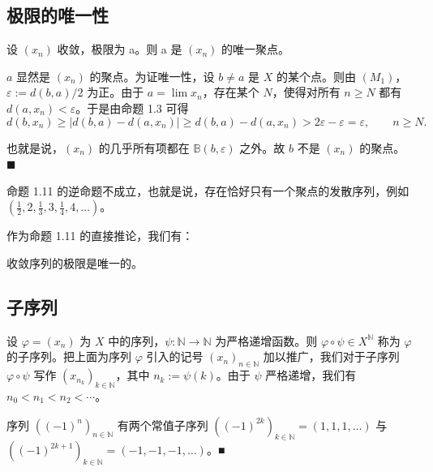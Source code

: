 \subsection*{极限的唯一性}

\begin{proposition}

设  $ (x_{n}) $ 收敛，极限为 a。则 a 是  $ (x_{n}) $ 的唯一聚点。

\proofhead
$ a $ 显然是  $ (x_n) $ 的聚点。为证唯一性，设  $ b \neq a $ 是  $ X $ 的某个点。则由  $ (M_1) $，$ \varepsilon := d(b, a)/2 $ 为正。由于  $ a = \lim x_n $，存在某个  $ N $，使得对所有  $ n \geq N $ 都有  $ d(a, x_n) < \varepsilon $。于是由命题 1.3 可得
\[
d(b,x_{n})\geq|d(b,a)-d(a,x_{n})|\geq d(b,a)-d(a,x_{n})>2\varepsilon-\varepsilon=\varepsilon,\qquad n\geq N.
\]

也就是说，$ (x_n) $ 的几乎所有项都在  $ \mathbb{B}(b, \varepsilon) $ 之外。故  $ b $ 不是  $ (x_n) $ 的聚点。 $ \blacksquare $

\end{proposition}

\begin{remark}

命题 1.11 的逆命题不成立，也就是说，存在恰好只有一个聚点的发散序列，例如  $ \left(\frac{1}{2}, 2, \frac{1}{3}, 3, \frac{1}{4}, 4, \ldots\right) $。

作为命题 1.11 的直接推论，我们有：

\end{remark}

\begin{corollary}

收敛序列的极限是唯一的。

\end{corollary}

\subsection*{子序列}

设 $\varphi = (x_n)$ 为 $X$ 中的序列，$\psi: \mathbb{N} \to \mathbb{N}$ 为严格递增函数。则 $\varphi \circ \psi \in X^{\mathbb{N}}$ 称为 $\varphi$ 的子序列。把上面为序列 $\varphi$ 引入的记号 $(x_n)_{n \in \mathbb{N}}$ 加以推广，我们对于子序列 $\varphi \circ \psi$ 写作 $(x_{n_k})_{k \in \mathbb{N}}$，其中 $n_k := \psi(k)$。由于 $\psi$ 严格递增，我们有 $n_0 < n_1 < n_2 < \cdots$。

\begin{example}

序列  $ ((-1)^n)_{n \in \mathbb{N}} $ 有两个常值子序列  $ ((-1)^{2k})_{k \in \mathbb{N}} = (1,1,1,\ldots) $ 与  $ ((-1)^{2k+1})_{k \in \mathbb{N}} = (-1,-1,-1,\ldots) $。■

\end{example}

